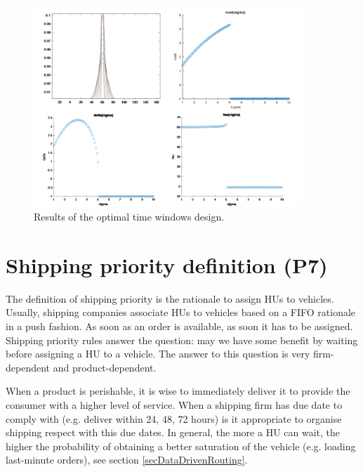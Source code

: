 \begin{figure}[hbt!]
\centering
\includegraphics[width=0.9\textwidth]{SectionDistribution/design_figures/fig_tw_example.png}
\captionsetup{type=figure}
\caption{Results of the optimal time windows design.}
\label{fig_tw_example}
\end{figure}

\section{Shipping priority definition (P7)}
The definition of shipping priority is the rationale to assign HUs to vehicles. Usually, shipping companies associate HUs to vehicles based on a FIFO rationale in a push fashion. As soon as an order is available, as soon it has to be assigned. Shipping priority rules answer the question: may we have some benefit by waiting before assigning a HU to a vehicle. The answer to this question is very firm-dependent and product-dependent.\par

When a product is perishable, it is wise to immediately deliver it to provide the consumer with a higher level of service. When a shipping firm has due date to comply with (e.g. deliver within 24, 48, 72 hours) is it appropriate to organise shipping respect with this due dates. In general, the more a HU can wait, the higher the probability of obtaining a better saturation of the vehicle (e.g. loading last-minute orders), see section \ref{secDataDrivenRouting}.









	
